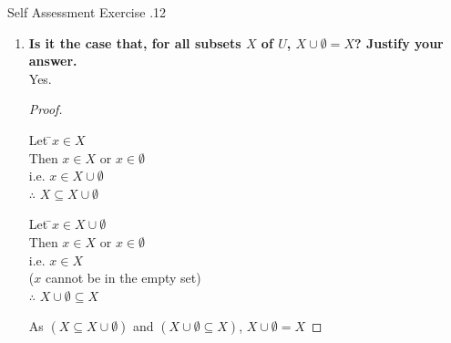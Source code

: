 \documentclass[../notes.tex]{subfiles}
\begin{document}
\begin{exercise}{Self Assessment Exercise \thechapter.12}
\begin{enumerate}
\begin{proof}
\begin{tabbing}
								Then \> $x \in W$, as $Y = W$\\
								$\therefore$ \> $X = W$ \` \qedhere
							\end{tabbing}
						\end{proof}
						\begin{proof}
							Suppose $X \subset Y$ and $Y \subset W$.
							\begin{tabbing}
								Let $\quad$ \= $x \in X$\\
								Then \> $x \in Y$, as $X \subset Y$\\
								Then \> $x \in W$, as $Y \subset W$\\
								$\therefore$ \> $X \subseteq W$\\
								\> $Y$ has at least one element not in $X$, as $X \subset Y$\\
								\> $W$ has at least one element not in $Y$, as $Y \subset W$\\
								So \> $W$ has at least two elements not in $X$\\
								i.e. $X \neq W$\\
								so $X \subset W$ \` \qedhere
							\end{tabbing}
						\end{proof}
					\pagebreak
					\item \textbf{Is it the case that, for all subsets $X$ of $U$, $X \cup \emptyset = X$? Justify your answer.}\\
						Yes.
						\begin{proof}
							$ $
							\begin{tabbing}
								Let \quad \=$x \in X$\\
								Then \> $x \in X$ or $x \in \emptyset$\\
								i.e. \> $x \in X \cup \emptyset$\\
								$\therefore$ \> $X \subseteq X \cup \emptyset$
							\end{tabbing}
							\begin{tabbing}
								Let \quad \=$x \in X \cup \emptyset$\\
								Then \> $x \in X$ or $x \in \emptyset$\\
								i.e. \> $x \in X$\\
								\> ($x$ cannot be in the empty set)\\
								$\therefore$ \> $X \cup \emptyset \subseteq X$
							\end{tabbing}
							As $(X \subseteq X \cup \emptyset)$ and $(X \cup \emptyset \subseteq X)$, $X \cup \emptyset = X$

\end{proof}
\end{enumerate}
\end{exercise}
\end{document}
